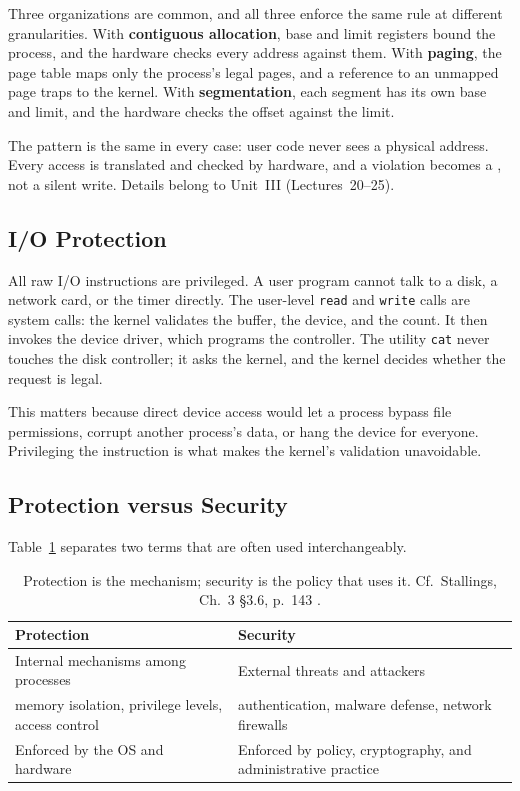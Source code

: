 \documentclass[11pt]{article}
\begin{document}
Three organizations are common, and all three enforce the same rule at
different granularities. With \textbf{contiguous allocation}, base and limit
registers bound the process, and the hardware checks every address against
them. With \textbf{paging}, the page table maps only the process's legal pages,
and a reference to an unmapped page traps to the kernel. With
\textbf{segmentation}, each segment has its own base and limit, and the
hardware checks the offset against the limit.

The pattern is the same in every case: user code never sees a physical address.
Every access is translated and checked by hardware, and a violation becomes a
, not a silent write. Details belong to Unit~III
(Lectures~20--25).

\subsection{I/O Protection}

All raw I/O instructions are privileged. A user program cannot talk to a disk,
a network card, or the timer directly. The user-level \texttt{read} and
\texttt{write} calls are system calls: the kernel validates the buffer, the
device, and the count. It then invokes the device driver, which programs the
controller. The utility \texttt{cat} never touches the disk controller; it asks
the kernel, and the kernel decides whether the request is legal.

This matters because direct device access would let a process bypass file
permissions, corrupt another process's data, or hang the device for everyone.
Privileging the instruction is what makes the kernel's validation unavoidable.

\subsection{Protection versus Security}

Table~\ref{tab:protection-security} separates two terms that are often used
interchangeably.

\begin{table}[h]
\centering
\renewcommand{\arraystretch}{1.4}
\begin{tabular}{p{}p{}}
\toprule
\textbf{Protection} & \textbf{Security} \\
\midrule
Internal mechanisms among processes &
External threats and attackers \\
memory isolation, privilege levels, access control &
authentication, malware defense, network firewalls \\
Enforced by the OS and hardware &
Enforced by policy, cryptography, and administrative practice \\
\bottomrule
\end{tabular}
\caption{Protection is the mechanism; security is the policy that uses it.
Cf.\ Stallings, Ch.~3 \S3.6, p.~143
\cite{StallingsOS_internals_design_principles}.}
\label{tab:protection-security}
\end{table}
\end{document}
